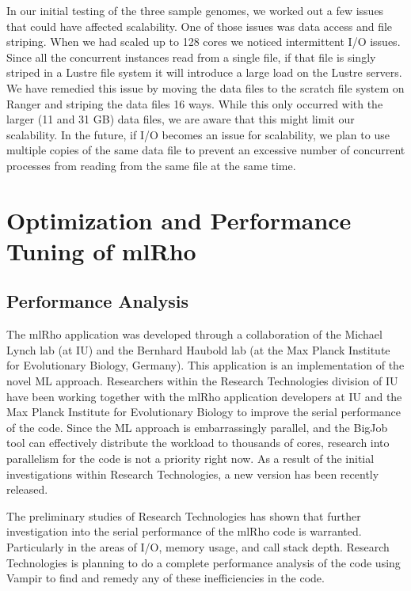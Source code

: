 \documentclass{sig-alternate}
\begin{document}
In our initial testing of the three sample genomes, we worked out a few issues that could have affected
scalability. One of those issues was data access and file striping. When we had scaled up to 128 cores we
noticed intermittent I/O issues. Since all the concurrent instances read from a single file, if that file is
singly striped in a Lustre file system it will introduce a large load on the Lustre servers. We have remedied
this issue by moving the data files to the scratch file system on Ranger and striping the data files 16
ways. While this only occurred with the larger (11 and 31 GB) data files, we are aware that this might limit
our scalability. In the future, if I/O becomes an issue for scalability, we plan to use multiple copies of the
same data file to prevent an excessive number of concurrent processes from reading from the same file at the same time.


\section{Optimization and Performance Tuning of mlRho}\label{sec:optimization}
\subsection{Performance Analysis}\label{subsec:analysis}
The mlRho application was developed through a collaboration of the Michael Lynch lab (at IU) and the Bernhard
Haubold lab (at the Max Planck Institute for Evolutionary Biology, Germany). This application is an implementation of
the novel ML approach. Researchers within the Research Technologies division of IU have been working together
with the mlRho application developers at IU and the Max Planck Institute for Evolutionary Biology to improve
the serial performance of the code. Since the ML approach is embarrassingly parallel, and the BigJob tool can
effectively distribute the workload to thousands of cores, research into parallelism for the code is not a priority right now. As a result of the initial investigations within Research Technologies, a new version has been recently released. 

The preliminary studies of Research Technologies has shown that further investigation into the serial
performance of the mlRho code is warranted. Particularly in the areas of I/O, memory usage, and call stack
depth. Research Technologies is planning to do a complete performance analysis of the code using Vampir to
find and remedy any of these inefficiencies in the code. 
\end{document}

